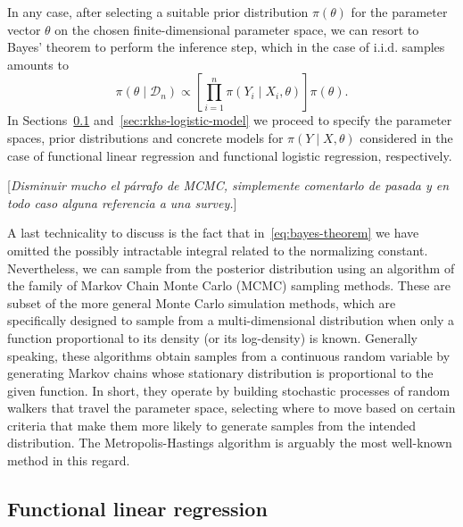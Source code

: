 \documentclass[ba]{imsart}
\numberwithin{equation}{section}
\theoremstyle{plain}
\newcommand\incomment[2][comment-red]{\color{#1}[\textit{#2}]\color{black}}
\begin{document}
In any case, after selecting a suitable prior distribution \(\pi(\theta)\) for the parameter vector \(\theta\) on the chosen finite-dimensional parameter space, we can resort to Bayes' theorem to perform the inference step, which in the case of i.i.d. samples amounts to
\begin{equation}\label{eq:bayes-theorem}
  \pi(\theta \mid \mathcal D_n) \propto \left[ \prod_{i=1}^n \pi(Y_i\mid X_i, \theta) \right]\pi(\theta).
\end{equation}
In Sections~\ref{sec:rkhs-linear-model} and~\ref{sec:rkhs-logistic-model} we proceed to specify the parameter spaces, prior distributions and concrete models for \(\pi(Y\mid X,\theta)\) considered in the case of functional linear regression and functional logistic regression, respectively.

\incomment{Disminuir mucho el párrafo de MCMC, simplemente comentarlo de pasada y en todo caso alguna referencia a una survey.}

A last technicality to discuss is the fact that in~\eqref{eq:bayes-theorem} we have omitted the possibly intractable integral related to the normalizing constant. Nevertheless, we can sample from the posterior distribution using an algorithm of the family of Markov Chain Monte Carlo (MCMC) sampling methods. These are subset of the more general Monte Carlo simulation methods, which are specifically designed to sample from a multi-dimensional distribution when only a function proportional to its density (or its log-density) is known. Generally speaking, these algorithms obtain samples from a continuous random variable by generating Markov chains whose stationary distribution is proportional to the given function. In short, they operate by building stochastic processes of random walkers that travel the parameter space, selecting where to move based on certain criteria that make them more likely to generate samples from the intended distribution. The Metropolis-Hastings algorithm \citep[e.g.][]{chib1995understanding} is arguably the most well-known method in this regard.

\subsection{Functional linear regression}\label{sec:rkhs-linear-model}
\end{document}
